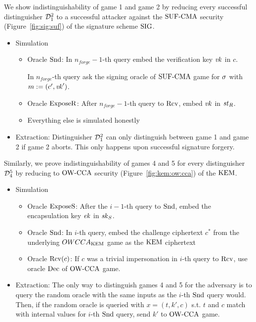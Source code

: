 We show indistinguishability of game 1 and game 2 by reducing every successful distinguisher $\mathcal{D}_1^2$ to a successful attacker against the ${\mathrm{SUF}\text{-}\mathrm{CMA}}$ security (Figure~\ref{fig:sig:suf}) of the signature scheme $\mathrm{SIG}$.

\begin{itemize}
    \item Simulation
    \begin{itemize}
        \item Oracle $\mathrm{Snd}$: 
        In $n_{forge}-1$-th query embed the verification key $\mathit{vk}$ in $c$.\par
        In $n_{forge}$-th query ask the signing oracle of ${\mathrm{SUF}\text{-}\mathrm{CMA}}$ game for $\sigma$ with $m:=(c',\mathit{vk}')$.
        \item  Oracle $\mathrm{ExposeR}$: 
        After $n_{forge}-1$-th query to $\mathrm{Rcv}$, embed $\mathit{vk}$ in $\mathit{st}_R$.
        \item Everything else is simulated honestly
    \end{itemize}
    \item Extraction: Distinguisher $\mathcal{D}_1^2$ can only distinguish between game 1 and game 2 if game 2 aborts.
    This only happens upon successful signature forgery.
\end{itemize}

Similarly, we prove indistinguishability of games 4 and 5 for every distinguisher $\mathcal{D}_4^5$ by reducing to ${\mathrm{OW}\text{-}\mathrm{CCA}}$ security (Figure~\ref{fig:kem:ow:cca}) of the $\mathrm{KEM}$.

\begin{itemize}
    \item Simulation
    \begin{itemize}
        \item Oracle $\mathrm{ExposeS}$: 
        After the $i-1$-th query to $\mathrm{Snd}$, embed the encapsulation key $\mathit{ek}$ in $\mathit{sk}_S$.
        \item  Oracle $\mathrm{Snd}$: 
        In $i$-th query, embed the challenge ciphertext $c^*$ from the underlying $OWCCA_{\mathrm{KEM}}$ game as the $\mathrm{KEM}$ ciphertext 
        \item Oracle $\mathrm{Rcv}(c)$: If $c$ was a trivial impersonation in $i$-th query to $\mathrm{Rcv}$, use oracle $\mathrm{Dec}$ of ${\mathrm{OW}\text{-}\mathrm{CCA}}$ game.
    \end{itemize}
    \item Extraction: The only way to distinguish games 4 and 5 for the adversary is to query the random oracle with the same inputs as the $i$-th $\mathrm{Snd}$ query would.
    Then, if the random oracle is queried with $x=(t,k',c)$ s.t. $t$ and $c$ match with internal values for $i$-th $\mathrm{Snd}$ query, send $k'$ to ${\mathrm{OW}\text{-}\mathrm{CCA}}$ game.

\end{itemize}

